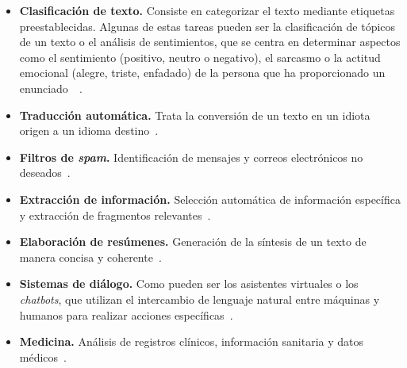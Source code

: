 \begin{itemize}
    \item \textbf{Clasificación de texto.} Consiste en categorizar el texto mediante etiquetas preestablecidas. Algunas de estas tareas pueden ser la clasificación de tópicos de un texto o el análisis de sentimientos, que se centra en determinar aspectos como el sentimiento (positivo, neutro o negativo), el sarcasmo o la actitud emocional (alegre, triste, enfadado) de la persona que ha proporcionado un enunciado~\cite{felbo2017using}~\cite{kim2014convolutional}.

    \item \textbf{Traducción automática.} Trata la conversión de un texto en un idiota origen a un idioma destino~\cite{wu2016google}.

    \item \textbf{Filtros de \textit{spam}.} Identificación de mensajes y correos electrónicos no deseados~\cite{sharmin2020convolutional}.

    \item \textbf{Extracción de información.} Selección automática de información específica y extracción de fragmentos relevantes~\cite{lample2016neural}.

    \item \textbf{Elaboración de resúmenes.} Generación de la síntesis de un texto de manera concisa y coherente~\cite{see2017get}.

    \item \textbf{Sistemas de diálogo.} Como pueden ser los asistentes virtuales o los \textit{chatbots}, que utilizan el intercambio de lenguaje natural entre máquinas y humanos para realizar acciones específicas~\cite{chao2019bert}.

    \item \textbf{Medicina.} Análisis de registros clínicos, información sanitaria y datos médicos~\cite{chen2019bert}.
\end{itemize}
